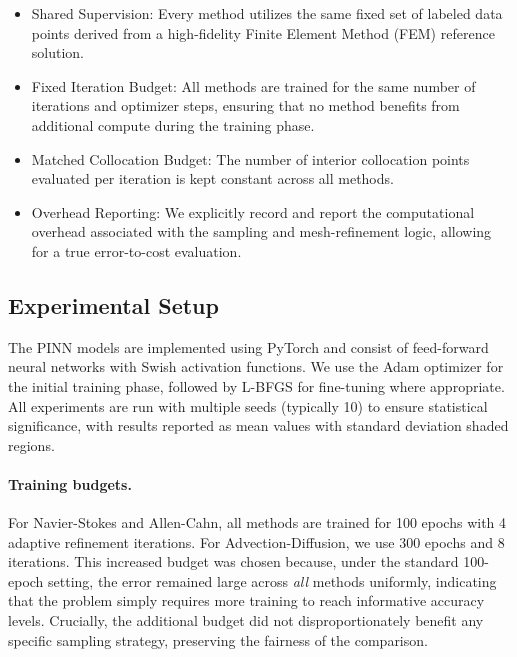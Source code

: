 \begin{itemize}
    \item Shared Supervision: Every method utilizes the same fixed set of labeled data points derived from a high-fidelity Finite Element Method (FEM) reference solution.
    \item Fixed Iteration Budget: All methods are trained for the same number of iterations and optimizer steps, ensuring that no method benefits from additional compute during the training phase.
    \item Matched Collocation Budget: The number of interior collocation points evaluated per iteration is kept constant across all methods.
    \item Overhead Reporting: We explicitly record and report the computational overhead associated with the sampling and mesh-refinement logic, allowing for a true error-to-cost evaluation.
\end{itemize}

\subsection{Experimental Setup}

The PINN models are implemented using PyTorch and consist of feed-forward neural networks with Swish activation functions. We use the Adam optimizer for the initial training phase, followed by L-BFGS for fine-tuning where appropriate. All experiments are run with multiple seeds (typically 10) to ensure statistical significance, with results reported as mean values with standard deviation shaded regions.

\paragraph{Training budgets.}
For Navier-Stokes and Allen-Cahn, all methods are trained for 100 epochs with 4 adaptive refinement iterations. For Advection-Diffusion, we use 300 epochs and 8 iterations. This increased budget was chosen because, under the standard 100-epoch setting, the error remained large across \emph{all} methods uniformly, indicating that the problem simply requires more training to reach informative accuracy levels. Crucially, the additional budget did not disproportionately benefit any specific sampling strategy, preserving the fairness of the comparison.
